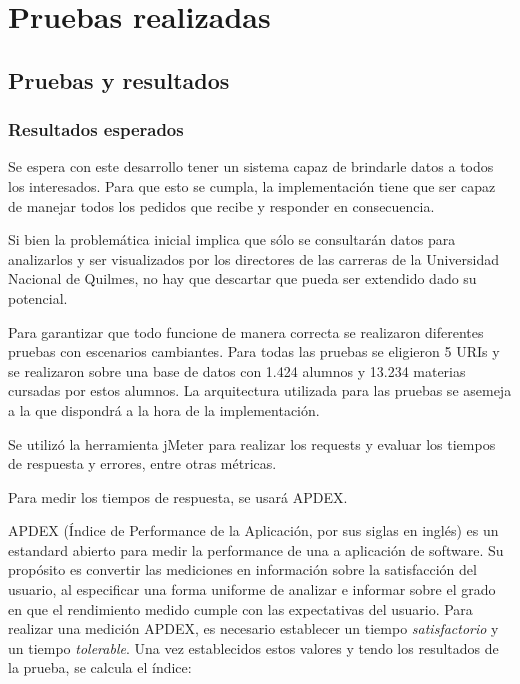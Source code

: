 \chapter{Pruebas realizadas}
\label{sec:implementacion}

\section[Pruebas y resultados]{Pruebas y resultados}

\subsection[Resultados esperados]{Resultados esperados}

Se espera con este desarrollo tener un sistema capaz de brindarle datos a todos los interesados. Para que esto se cumpla, la implementación tiene que ser capaz de manejar todos los pedidos que recibe y responder en consecuencia. 

Si bien la problemática inicial implica que sólo se consultarán datos para analizarlos y ser visualizados por los directores de las carreras de la Universidad Nacional de Quilmes, no hay que descartar que pueda ser extendido dado su potencial.

Para garantizar que todo funcione de manera correcta se realizaron diferentes pruebas con escenarios cambiantes.
Para todas las pruebas se eligieron 5 URIs y se realizaron sobre una base de datos con 1.424 alumnos y 13.234 materias cursadas por estos alumnos.
La arquitectura utilizada para las pruebas se asemeja a la que dispondrá a la hora de la implementación.

Se utilizó la herramienta jMeter para realizar los requests y evaluar los tiempos de respuesta y errores, entre otras métricas.

Para medir los tiempos de respuesta, se usará APDEX.

APDEX (Índice de Performance de la Aplicación, por sus siglas en inglés) es un estandard abierto para medir la performance de una a aplicación de software. Su propósito es convertir las mediciones en información sobre la satisfacción del usuario, al especificar una forma uniforme de analizar e informar sobre el grado en que el rendimiento medido cumple con las expectativas del usuario.
Para realizar una medición APDEX, es necesario establecer un tiempo \emph{satisfactorio} y un tiempo \emph{tolerable}.
Una vez establecidos estos valores y tendo los resultados de la prueba, se calcula el índice:

